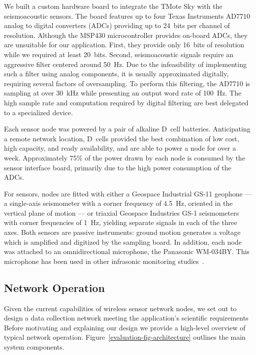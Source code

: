 We built a custom hardware board to integrate the TMote Sky with the
seismoacoustic sensors. The board features up to four Texas Instruments
AD7710 analog to digital converters (ADCs) providing up to 24~bits per
channel of resolution. Although the MSP430 microcontroller provides on-board
ADCs, they are unsuitable for our application. First, they provide only
16~bits of resolution while we required at least 20~bits. Second,
seismoacoustic signals require an aggressive filter centered around 50~Hz.
Due to the infeasibility of implementing such a filter using analog
components, it is usually approximated digitally, requiring several factors
of oversampling. To perform this filtering, the AD7710 is sampling at over
30~kHz while presenting an output word rate of 100~Hz. The high sample rate
and computation required by digital filtering are best delegated to a
specialized device.

Each sensor node was powered by a pair of alkaline D~cell batteries.
Anticipating a remote network location, D~cells provided the best combination
of low cost, high capacity, and ready availability, and are able to power a
node for over a week. Approximately 75\% of the power drawn by each node is
consumed by the sensor interface board, primarily due to the high power
consumption of the ADCs.

For sensors, nodes are fitted with either a Geospace Industrial GS-11
geophone --- a single-axis seismometer with a corner frequency of 4.5~Hz,
oriented in the vertical plane of motion --- or triaxial Geospace Industries
GS-1 seismometers with corner frequencies of 1~Hz, yielding separate signals
in each of the three axes. Both sensors are passive instruments: ground
motion generates a voltage which is amplified and digitized by the sampling
board. In addition, each node was attached to an omnidirectional microphone,
the Panasonic WM-034BY. This microphone has been used in other infrasonic
monitoring studies~\cite{johnson-etal-04b}.

\subsection{Network Operation}

Given the current capabilities of wireless sensor network nodes, we set out
to design a data collection network meeting the application's scientific
requirements Before motivating and explaining our design we provide a
high-level overview of typical network operation.
Figure~\ref{evaluation-fig-architecture} outlines the main system components.

